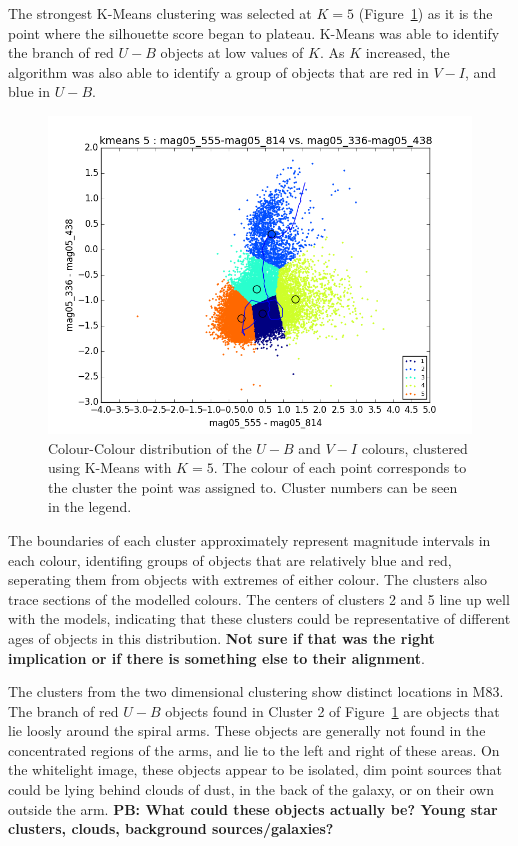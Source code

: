 The strongest K-Means clustering was selected at $K=5$ (Figure~\ref{fig:BB2dKM5}) as it is the point where the silhouette score began to plateau.
K-Means was able to identify the branch of red $U - B$ objects at low values of $K$.
As $K$ increased, the algorithm was also able to identify a group of objects that are red in $V - I$, and blue in $U - B$. 

\begin{figure}[H]
\centering
\includegraphics[width=\linewidth]{figs/broad/kmeans_color_5cl_mag05_555-mag05_814vsmag05_336-mag05_438}
\caption{Colour-Colour distribution of the $U - B$ and $V - I$ colours, clustered using K-Means with $K=5$. The colour of each point corresponds to the cluster the point was assigned to. Cluster numbers can be seen in the legend.}
\label{fig:BB2dKM5}
\end{figure}

The boundaries of each cluster approximately represent magnitude intervals in each colour, identifing groups of objects that are relatively blue and red, seperating them from objects with extremes of either colour.
The clusters also trace sections of the modelled colours. 
The centers of clusters 2 and 5 line up well with the models, indicating that these clusters could be representative of different ages of objects in this distribution.
\textbf{Not sure if that was the right implication or if there is something else to their alignment}. 

The clusters from the two dimensional clustering show distinct locations in M83.
The branch of red $U - B$ objects found in Cluster 2 of Figure~\ref{fig:BB2dKM5} are objects that lie loosly around the spiral arms.
These objects are generally not found in the concentrated regions of the arms, and lie to the left and right of these areas.
On the whitelight image, these objects appear to be isolated, dim point sources that could be lying behind clouds of dust, in the back of the galaxy, or on their own outside the arm.
\textbf{PB: What could these objects actually be? Young star clusters, clouds, background sources/galaxies?}

